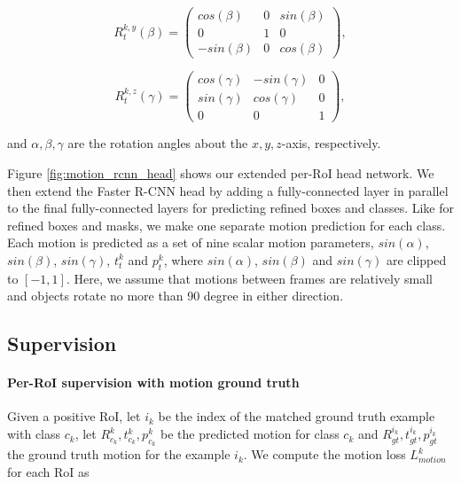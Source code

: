 \begin{equation}
R_t^{k,y}(\beta) =
\begin{pmatrix}
  cos(\beta) & 0 & sin(\beta) \\
  0 & 1 & 0 \\
  -sin(\beta) & 0 & cos(\beta)
\end{pmatrix},
\end{equation}

\begin{equation}
R_t^{k,z}(\gamma) =
\begin{pmatrix}
  cos(\gamma) & -sin(\gamma) & 0 \\
  sin(\gamma) & cos(\gamma) & 0 \\
  0 & 0 & 1
\end{pmatrix},
\end{equation}

and $\alpha, \beta, \gamma$ are the rotation angles about the $x,y,z$-axis, respectively.


Figure \ref{fig:motion_rcnn_head} shows our extended per-RoI head network.
We then extend the Faster R-CNN head by adding a fully-connected layer in parallel to the final fully-connected layers for
predicting refined boxes and classes.
Like for refined boxes and masks, we make one separate motion prediction for each class.
Each motion is predicted as a set of nine scalar motion parameters,
$sin(\alpha)$, $sin(\beta)$, $sin(\gamma)$, $t_t^k$ and $p_t^k$,
where $sin(\alpha)$, $sin(\beta)$ and $sin(\gamma)$ are clipped to $[-1, 1]$.
Here, we assume that motions between frames are relatively small
and objects rotate no more than 90 degree in either direction.


\subsection{Supervision}

\paragraph{Per-RoI supervision with motion ground truth}
Given a positive RoI, let $i_k$ be the index of the matched ground truth example with class $c_k$,
let $R_{c_k}^k, t_{c_k}^k, p_{c_k}^k$ be the predicted motion for class $c_k$
and $R_{gt}^{i_k}, t_{gt}^{i_k}, p_{gt}^{i_k}$ the ground truth motion for the example $i_k$.
We compute the motion loss $L_{motion}^k$ for each RoI as


